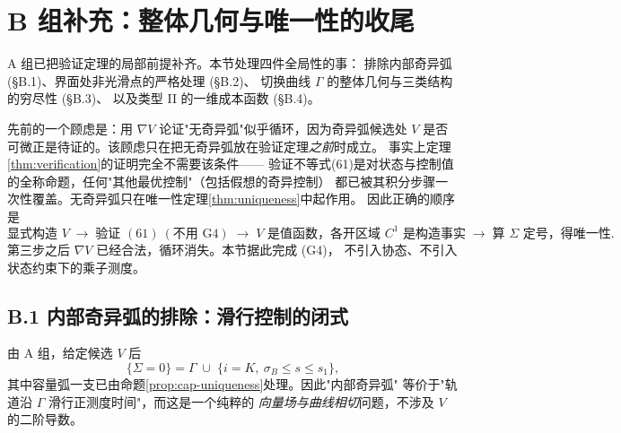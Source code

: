 
\section*{B 组补充：整体几何与唯一性的收尾}

A 组已把验证定理的局部前提补齐。本节处理四件全局性的事：
排除内部奇异弧 (\S B.1)、界面处非光滑点的严格处理 (\S B.2)、
切换曲线 $\Gamma$ 的整体几何与三类结构的穷尽性 (\S B.3)、
以及类型 II 的一维成本函数 (\S B.4)。

\begin{remark}
\label{rem:no-pmp}
先前的一个顾虑是：用 $\nabla V$ 论证"无奇异弧"似乎循环，因为奇异弧候选处
$V$ 是否可微正是待证的。该顾虑只在把无奇异弧放在验证定理\emph{之前}时成立。
事实上定理\ref{thm:verification}的证明完全不需要该条件——
验证不等式(61)是对状态与控制值的全称命题，任何"其他最优控制"（包括假想的奇异控制）
都已被其积分步骤一次性覆盖。无奇异弧只在唯一性定理\ref{thm:uniqueness}中起作用。
因此正确的顺序是
\[
  \text{显式构造 }V
  \;\longrightarrow\;
  \text{验证 }(61)\ (\text{不用 G4})
  \;\longrightarrow\;
  V\text{ 是值函数，各开区域 }C^1\text{ 是构造事实}
  \;\longrightarrow\;
  \text{算 }\Sigma\text{ 定号，得唯一性.}
\]
第三步之后 $\nabla V$ 已经合法，循环消失。本节据此完成 (G4)，
不引入协态、不引入状态约束下的乘子测度。
\end{remark}


\subsection*{B.1 内部奇异弧的排除：滑行控制的闭式}

由 A 组，给定候选 $V$ 后
\begin{equation}
  \{\Sigma=0\}=\Gamma\;\cup\;\{i=K,\ \sigma_B\le s\le s_1\},
  \label{eq:B-Sigma-zero-set}
\end{equation}
其中容量弧一支已由命题\ref{prop:cap-uniqueness}处理。因此"内部奇异弧"
等价于"轨道沿 $\Gamma$ 滑行正测度时间"，而这是一个纯粹的
\emph{向量场与曲线相切}问题，不涉及 $V$ 的二阶导数。

